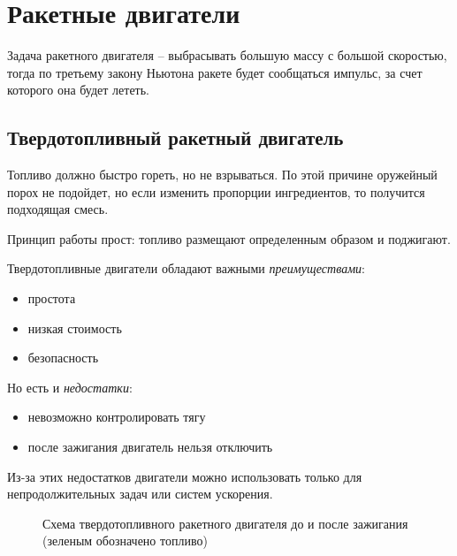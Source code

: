\documentclass[a4paper,14pt]{article}
\begin{document}
    \section{Ракетные двигатели}
        Задача ракетного двигателя -- выбрасывать большую массу с большой скоростью, тогда по третьему закону Ньютона ракете будет сообщаться импульс, за счет которого она будет лететь.

    \subsection{Твердотопливный ракетный двигатель}
        Топливо должно быстро гореть, но не взрываться. По этой причине оружейный порох не подойдет, но если изменить пропорции ингредиентов, то получится подходящая смесь.

        Принцип работы прост: топливо размещают определенным образом и поджигают.

        Твердотопливные двигатели обладают важными \textit{преимуществами}:
        \begin{itemize}
            \item простота
            \item низкая стоимость
            \item безопасность
        \end{itemize}
        Но есть и \textit{недостатки}:
        \begin{itemize}
            \item невозможно контролировать тягу
            \item после зажигания двигатель нельзя отключить
        \end{itemize}

        Из-за этих недостатков двигатели можно использовать только для непродолжительных задач или систем ускорения.
        \begin{figure}[h]
            \caption{Схема твердотопливного ракетного двигателя до и после зажигания (зеленым обозначено топливо)}
        \end{figure}
\end{document}
